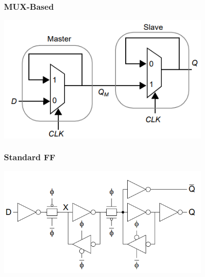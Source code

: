 \documentclass[11pt]{article}
\begin{document}
\begin{multicols}{2}
    \subsubsection*{MUX-Based}
    \begin{minipage}{\linewidth}
        \begin{center}
            \includegraphics[width=0.8\textwidth]{MUX.png}
        \end{center}
    \end{minipage}
    \subsubsection*{Standard FF}
    \begin{minipage}{\linewidth}
        \begin{center}
            \includegraphics[width=0.8\textwidth]{PTL.png}
        \end{center}
    \end{minipage}
\end{multicols}

\pagebreak
\end{document}
